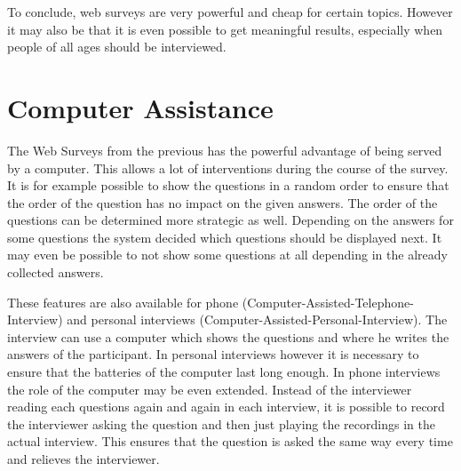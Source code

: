\documentclass{report}
\begin{document}
To conclude, web surveys are very powerful and cheap for certain topics. However it may also be that it is even possible to get meaningful results, especially when people of all ages should be interviewed.

\section{Computer Assistance}

The Web Surveys from the previous has the powerful advantage of being served by a computer. This allows a lot of interventions during the course of the survey. It is for example possible to show the questions in a random order to ensure that the order of the question has no impact on the given answers. The order of the questions can be determined more strategic as well. Depending on the answers for some questions the system decided which questions should be displayed next. It may even be possible to not show some questions at all depending in the already collected answers.

These features are also available for phone (Computer-Assisted-Telephone-Interview) and personal interviews (Computer-Assisted-Personal-Interview). The interview can use a computer which shows the questions and where he writes the answers of the participant. In personal interviews however it is necessary to ensure that the batteries of the computer last long enough. In phone interviews the role of the computer may be even extended. Instead of the interviewer reading each questions again and again in each interview, it is possible to record the interviewer asking the question and then just playing the recordings in the actual interview. This ensures that the question is asked the same way every time and relieves the interviewer.
\end{document}
